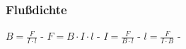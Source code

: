 \subsubsection{Flußdichte} 
\begin{minipage}{0.45\textwidth} 
\end{minipage} 
\begin{minipage}{0.45\textwidth} 
 
\legende{}\end{minipage} 
 
$ B = \frac{ F}{I\cdot l} $ - $ F = B\cdot I\cdot l $ - $ I = \frac{ F}{B\cdot l} $ - $ l = \frac{ F}{I\cdot B} $ - \\ 
 
